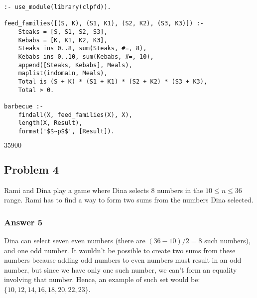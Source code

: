 \documentclass[11pt]{article}
\begin{document}
\lstset{language=prolog,label= ,caption= ,captionpos=b,numbers=none}
\begin{lstlisting}
:- use_module(library(clpfd)).

feed_families([(S, K), (S1, K1), (S2, K2), (S3, K3)]) :-
    Steaks = [S, S1, S2, S3],
    Kebabs = [K, K1, K2, K3],
    Steaks ins 0..8, sum(Steaks, #=, 8),
    Kebabs ins 0..10, sum(Kebabs, #=, 10),
    append([Steaks, Kebabs], Meals),
    maplist(indomain, Meals),
    Total is (S + K) * (S1 + K1) * (S2 + K2) * (S3 + K3),
    Total > 0.

barbecue :-
    findall(X, feed_families(X), X),
    length(X, Result),
    format('$$~p$$', [Result]).
\end{lstlisting}

\(35900\)

\subsection{Problem 4}
\label{sec:orgheadline9}
Rami and Dina play a game where Dina selects 8 numbers in the \(10 \leq n \leq
   36\) range.  Rami has to find a way to form two sums from the numbers Dina
selected.

\subsubsection{Answer 5}
\label{sec:orgheadline8}
Dina can select seven even numbers (there are \((36 - 10) / 2 = 8\) such
numbers), and one odd number.  It wouldn't be possible to create two sums
from these numbers because adding odd numbers to even numbers must result in
an odd number, but since we have only one such number, we can't form an
equality involving that number.  Hence, an example of such set would be:
\(\{10, 12, 14, 16, 18, 20, 22, 23\}\).
\end{document}
